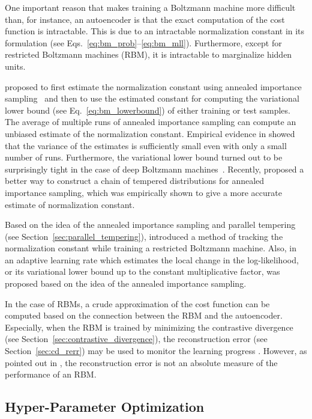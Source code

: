 \documentclass{now}
\begin{document}
One important reason that makes training a Boltzmann machine more difficult
than, for instance, an autoencoder is that the exact computation of the cost
function is intractable.  This is due to an intractable normalization constant
in its formulation (see Eqs.~\eqref{eq:bm_prob}--\eqref{eq:bm_mll}).
Furthermore, except for restricted Boltzmann machines (RBM), it is intractable
to marginalize hidden units.

\citet{Salakhutdinov2008a} proposed to first estimate the normalization constant
using annealed importance sampling~\citep{Neal1998} and then to use the
estimated constant for computing the variational lower bound (see
Eq.~\eqref{eq:bm_lowerbound}) of either training or test samples. The average of
multiple runs of annealed importance sampling can compute an unbiased estimate
of the normalization constant. Empirical evidence in \citep{Salakhutdinov2008}
showed that the variance of the estimates is sufficiently small even with only a
small number of runs.  Furthermore, the variational lower bound turned out to be
surprisingly tight in the case of deep Boltzmann
machines~\citep{Salakhutdinov2012nc}. Recently, \citet{Grosses2013} proposed a
better way to construct a chain of tempered distributions for annealed
importance sampling, which was empirically shown to give a more accurate
estimate of normalization constant.

Based on the idea of the annealed importance sampling and parallel tempering
(see Section~\ref{sec:parallel_tempering}), \citet{Desjardins2011} introduced a
method of tracking the normalization constant while training a restricted
Boltzmann machine. Also, in \citep{Cho2011icml} an adaptive learning rate which
estimates the local change in the log-likelihood, or its variational lower bound
up to the constant multiplicative factor, was proposed based on the idea of the
annealed importance sampling.

In the case of RBMs, a crude approximation of the cost function can be computed
based on the connection between the RBM and the autoencoder. Especially, when
the RBM is trained by minimizing the contrastive divergence (see
Section~\ref{sec:contrastive_divergence}), the reconstruction error (see
Section~\ref{sec:cd_rerr}) may be used to monitor the learning progress
\citep{Hinton2012rbm}.  However, as pointed out in \citep{Hinton2012rbm}, the
reconstruction error is not an absolute measure of the performance of an RBM.

\subsection{Hyper-Parameter Optimization}
\label{sec:hyperopt}
\end{document}
